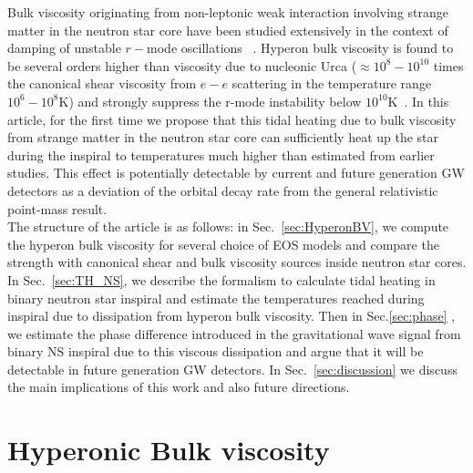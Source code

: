 \documentclass[%
 reprint,
 amsmath,amssymb,
 aps,
]{revtex4-2}
\begin{document}
Bulk viscosity originating from non-leptonic weak interaction involving strange matter in the neutron star core have been studied extensively in the context of damping of unstable $r-$mode oscillations ~\cite{Jones2001,Lindblom2002,Debi_2006,Dalen2004,Jha2010,Haskell2010,Ofengeim,Alford2021,Jha2022}. Hyperon bulk viscosity is found to be several orders higher than viscosity due to nucleonic Urca ($\approx 10^{8} - 10^{10}$ times the canonical shear viscosity from $e-e$ scattering in the temperature range $10^{6}-10^8$K) and strongly suppress the r-mode instability below $10^{10}$K~\cite{Lindblom2002,Haskell2010}. In this article, for the first time we propose that this tidal heating due to bulk viscosity from strange matter in the neutron star core can sufficiently heat up the star during the inspiral to temperatures much higher than estimated from earlier studies. This effect is potentially detectable by current and future generation GW detectors as a deviation of the orbital decay rate from the general relativistic point-mass result. \\

The structure of the article is as follows: in Sec.~\ref{sec:HyperonBV}, we compute the hyperon bulk viscosity for several choice of EOS models and compare the strength with canonical shear and bulk viscosity sources inside neutron star cores. In Sec.~\ref{sec:TH_NS}, we describe the formalism to calculate tidal heating in binary neutron star inspiral and estimate the temperatures reached during inspiral due to dissipation from hyperon bulk viscosity. Then in Sec.\ref{sec:phase} , we estimate the phase difference introduced in the gravitational wave signal from binary NS inspiral due to this viscous dissipation and argue that it will be detectable in future generation GW detectors. In Sec.~\ref{sec:discussion} we discuss the main implications of this work and also future directions. 



\section{\label{sec:HyperonBV} Hyperonic Bulk viscosity}

\end{document}
